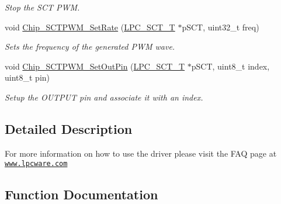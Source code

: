 \begin{DoxyCompactItemize}
\begin{DoxyCompactList}\small\item\em Stop the S\+CT P\+WM. \end{DoxyCompactList}\item 
void \hyperlink{group___s_c_t___p_w_m__18_x_x__43_x_x_gadbcc6b9f14952ee1b2f293521918755a}{Chip\+\_\+\+S\+C\+T\+P\+W\+M\+\_\+\+Set\+Rate} (\hyperlink{struct_l_p_c___s_c_t___t}{L\+P\+C\+\_\+\+S\+C\+T\+\_\+T} $\ast$p\+S\+CT, uint32\+\_\+t freq)
\begin{DoxyCompactList}\small\item\em Sets the frequency of the generated P\+WM wave. \end{DoxyCompactList}\item 
void \hyperlink{group___s_c_t___p_w_m__18_x_x__43_x_x_ga4ff891c31557e7f9b6a2ec8d8370d3c6}{Chip\+\_\+\+S\+C\+T\+P\+W\+M\+\_\+\+Set\+Out\+Pin} (\hyperlink{struct_l_p_c___s_c_t___t}{L\+P\+C\+\_\+\+S\+C\+T\+\_\+T} $\ast$p\+S\+CT, uint8\+\_\+t index, uint8\+\_\+t pin)
\begin{DoxyCompactList}\small\item\em Setup the O\+U\+T\+P\+UT pin and associate it with an index. \end{DoxyCompactList}\end{DoxyCompactItemize}


\subsection{Detailed Description}
For more information on how to use the driver please visit the F\+AQ page at \href{http://www.lpcware.com/content/faq/how-use-sct-standard-pwm-using-lpcopen}{\tt www.\+lpcware.\+com} 

\subsection{Function Documentation}
\mbox{\label{group___s_c_t___p_w_m__18_x_x__43_x_x_ga26e3032074e4a05c9da08309d9614bcd}} 

